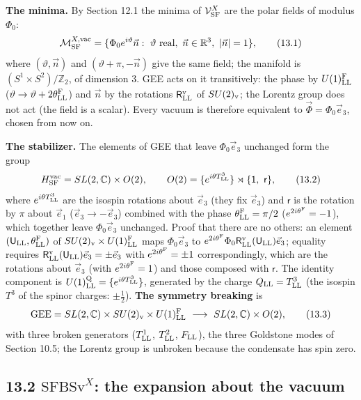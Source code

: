 \documentclass[
  10pt,
]{article}
\begin{document}
\textbf{The minima.} By Section 12.1 the minima of
\(\mathcal V^X_{\rm SF}\) are the polar fields of modulus \(\Phi_0\):
\[\mathcal M^{X,{\rm vac}}_{\rm SF}=\{\Phi_0e^{i\vartheta}\vec n:\ \vartheta\ \text{real},\ \vec n\in\mathbb R^3,\ \lvert\vec n\rvert=1\},\tag{13.1}\]
where \((\vartheta,\vec n)\) and \((\vartheta+\pi,-\vec n)\) give the
same field; the manifold is \((S^1\times S^2)/\mathbb Z_2\), of
dimension 3. GEE acts on it transitively: the phase by
\(U(1)^{\rm F}_{\rm LL}\)
(\(\vartheta\to\vartheta+2\theta^{\rm F}_{\rm LL}\)) and \(\vec n\) by
the rotations \(\mathsf R^{\rm v}_{\rm LL}\) of \(SU(2)_{\rm v}\); the
Lorentz group does not act (the field is a scalar). Every vacuum is
therefore equivalent to \(\vec\Phi=\Phi_0\vec e_3\), chosen from now on.

\textbf{The stabilizer.} The elements of GEE that leave
\(\Phi_0\vec e_3\) unchanged form the group
\[H^{\rm vac}_{\rm SF}=SL(2,\mathbb C)\times O(2),\qquad O(2)=\{e^{i\theta T^3_{\rm LL}}\}\rtimes\{\mathsf 1,\ \mathsf r\},\tag{13.2}\]
where \(e^{i\theta T^3_{\rm LL}}\) are the isospin rotations about
\(\vec e_3\) (they fix \(\vec e_3\)) and \(\mathsf r\) is the rotation
by \(\pi\) about \(\vec e_1\) (\(\vec e_3\to-\vec e_3\)) combined with
the phase \(\theta^{\rm F}_{\rm LL}=\pi/2\)
(\(e^{2i\theta^{\rm F}}=-1\)), which together leave \(\Phi_0\vec e_3\)
unchanged. Proof that there are no others: an element
\((\mathsf U_{\rm LL},\theta^{\rm F}_{\rm LL})\) of
\(SU(2)_{\rm v}\times U(1)^{\rm F}_{\rm LL}\) maps \(\Phi_0\vec e_3\) to
\(e^{2i\theta^{\rm F}}\Phi_0\mathsf R^{\rm v}_{\rm LL}(\mathsf U_{\rm LL})\vec e_3\);
equality requires
\(\mathsf R^{\rm v}_{\rm LL}(\mathsf U_{\rm LL})\vec e_3=\pm\vec e_3\)
with \(e^{2i\theta^{\rm F}}=\pm1\) correspondingly, which are the
rotations about \(\vec e_3\) (with \(e^{2i\theta^{\rm F}}=1\)) and those
composed with \(\mathsf r\). The identity component is
\(U(1)^{\rm Q}_{\rm LL}=\{e^{i\theta T^3_{\rm LL}}\}\), generated by the
charge \(Q_{\rm LL}=T^3_{\rm LL}\) (the isospin \(T^3\) of the spinor
charges: \(\pm\tfrac12\)). \textbf{The symmetry breaking} is
\[\mathrm{GEE}=SL(2,\mathbb C)\times SU(2)_{\rm v}\times U(1)^{\rm F}_{\rm LL}\ \longrightarrow\ SL(2,\mathbb C)\times O(2),\tag{13.3}\]
with three broken generators (\(T^1_{\rm LL}\), \(T^2_{\rm LL}\),
\(F_{\rm LL}\)), the three Goldstone modes of Section 10.5; the Lorentz
group is unbroken because the condensate has spin zero.

\hypertarget{mathrmsfbsvx-the-expansion-about-the-vacuum}{%
\subsection{\texorpdfstring{13.2 \(\mathrm{SFBSv}^X\): the expansion
about the
vacuum}{13.2 \textbackslash mathrm\{SFBSv\}\^{}X: the expansion about the vacuum}}\label{mathrmsfbsvx-the-expansion-about-the-vacuum}}
\end{document}
